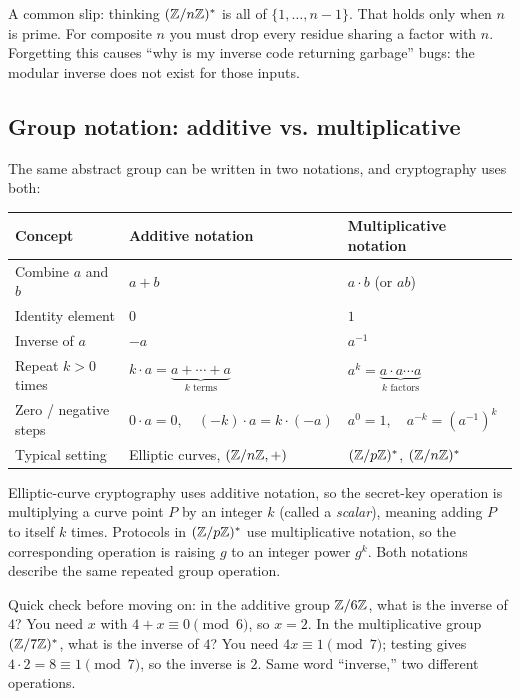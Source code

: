 \begin{trapbox}
A common slip: thinking $(\mathbb{Z}/n\mathbb{Z})^{*}$ is all of $\{1,\dots,n-1\}$. That holds only when
$n$ is prime. For composite $n$ you must drop every residue sharing a factor with $n$.
Forgetting this causes ``why is my inverse code returning garbage''
bugs: the modular inverse does not exist for those inputs.
\end{trapbox}

\subsection{Group notation: additive vs. multiplicative}

The same abstract group can be written in two notations, and cryptography uses both:
\begin{center}
\small
\begin{tabular}{lll}
\toprule
\textbf{Concept} & \textbf{Additive notation} & \textbf{Multiplicative notation} \\
\midrule
Combine $a$ and $b$ & $a + b$ & $a \cdot b$ (or $ab$) \\
Identity element & $0$ & $1$ \\
Inverse of $a$ & $-a$ & $a^{-1}$ \\
Repeat $k > 0$ times & $k \cdot a = \underbrace{a + \cdots + a}_{k\text{ terms}}$ & $a^k = \underbrace{a \cdot a \cdots a}_{k\text{ factors}}$ \\
Zero / negative steps & $0 \cdot a = 0,\quad (-k)\cdot a = k\cdot(-a)$ & $a^0 = 1,\quad a^{-k} = (a^{-1})^k$ \\
Typical setting & Elliptic curves, $(\mathbb{Z}/n\mathbb{Z}, +)$ & $(\mathbb{Z}/p\mathbb{Z})^{*}$, $(\mathbb{Z}/n\mathbb{Z})^{*}$ \\
\bottomrule
\end{tabular}
\end{center}
Elliptic-curve cryptography uses additive notation, so the secret-key operation is multiplying a curve point $P$ by an integer $k$ (called a \emph{scalar}), meaning adding $P$ to itself $k$ times. Protocols in $(\mathbb{Z}/p\mathbb{Z})^{*}$ use multiplicative notation, so the corresponding operation is raising $g$ to an integer power $g^k$. Both notations describe the same repeated group operation.

\begin{walkbox}
Quick check before moving on: in the additive group $\mathbb{Z}/6\mathbb{Z}$, what is the inverse of $4$?
You need $x$ with $4 + x \equiv 0 \pmod 6$, so $x = 2$. In the multiplicative group
$(\mathbb{Z}/7\mathbb{Z})^{*}$, what is the inverse of $4$? You need $4x \equiv 1 \pmod 7$; testing gives
$4 \cdot 2 = 8 \equiv 1 \pmod 7$, so the inverse is $2$. Same word ``inverse,'' two different
operations.
\end{walkbox}

